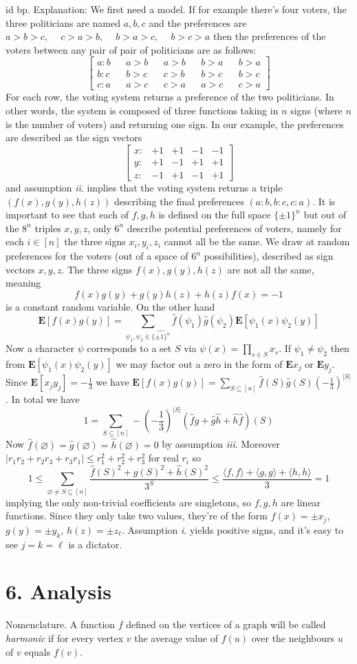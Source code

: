 \documentclass[oneside]{book}
\renewcommand{\empty}{\varnothing}
\newcommand{\sub}{\subseteq}
\newcommand{\inner}[1]{\langle #1\rangle}
\newcommand{\E}{\mathbf{E}}
\newcommand{\set}[1]{\{ #1\}}
\newcommand{\fit}[1]{\left( #1\right)}
\newcommand{\abs}[1]{\left\lvert #1\right\rvert}
\newcommand{\spc}{\phantom{-}}
\renewcommand{\i}{{\it i}. }
\newcommand{\ii}{{\it ii}. }
\newcommand{\iii}{{\it iii}. }
\newcommand\chap[1]{%
  \chapter*{#1}%
  \addcontentsline{toc}{chapter}{#1}}
\begin{document}
id bp. Explanation: We first need a model. If for example there's four voters, the three politicians are named $a,b,c$ and the preferences are
$a>b>c, \spc c>a>b, \spc b>a>c, \spc b>c>a$
then the preferences of the voters between any pair of pair of politicians are as follows:
$$\begin{bmatrix}
    a:b && a>b && a>b && b>a && b>a \\
b:c && b>c && c>b && b>c && b>c \\
c:a && a>c && c>a && a>c && c>a 
\end{bmatrix}$$
For each row, the voting system returns a preference of the two politicians. In other words, the system is composed of three functions taking in $n$ signs (where $n$ is the number of voters) and returning one sign. In our example, the preferences are described as the sign vectors
$$\begin{bmatrix}
x: & +1 & +1 & -1 & -1 \\
y: & +1 & -1 & +1 & +1 \\
z: & -1 & +1 & -1 & +1 
\end{bmatrix}  $$
and assumption \ii implies that the voting system returns a triple $(f(x),g(y),h(z))$ describing the final preferences $(a:b, b:c, c:a)$. It is important to see that each of $f,g,h$ is defined on the full space $\set{\pm1}^n$ but out of the $8^n$ triples $x,y,z$, only $6^n$ describe potential preferences of voters, namely for each $i\in[n]$ the three signs $x_i,y_i,z_i$ cannot all be the same. We draw at random preferences for the voters (out of a space of $6^n$ possibilities), described as sign vectors $x,y,z$. The three signs $f(x),g(y),h(z)$ are not all the same, meaning 
$$f(x)g(y)+g(y)h(z)+h(z)f(x)=-1$$
is a constant random variable. On the other hand
$$\E[f(x)g(y)]=\sum_{\psi_1,\psi_2\in\widehat{\set{\pm1}^n}}\hat{f}(\psi_1)\hat{g}(\psi_2)\E[\psi_1(x)\psi_2(y)]$$
Now a character $\psi$ corresponds to a set $S$ via $\psi(x)=\prod_{s\in S}x_s$. If $\psi_1\neq\psi_2$ then from $\E[\psi_1(x)\psi_2(y)]$ we may factor out a zero in the form of $\E x_j$ or $\E y_j$. Since $\E[x_jy_j]=-\frac{1}{3}$ we have  $\E[f(x)g(y)]=\sum_{S\sub[n]} \hat{f}(S)\hat{g}(S) \fit{-\frac{1}{3}}^{\abs{S}}$. In total we have
$$1 = \sum_{S\sub[n]}-\fit{-\frac{1}{3}}^{\abs{S}}\fit{\hat{f}\hat{g}+\hat{g}\hat{h}+\hat{h}\hat{f}}(S)$$
Now $\hat{f}(\empty)=\hat{g}(\empty)=\hat{h}(\empty)=0$ by assumption \iii Moreover $\abs{r_1r_2+r_2r_3+r_3r_1}\le r_1^2+r_2^2+r_3^2$ for real $r_i$ so 
$$1\le \sum_{\empty\neq S\sub[n]}\dfrac{\hat{f}(S)^2+\hat{g}(S)^2+\hat{h}(S)^2}{3^S}\le \dfrac{\inner{f,f}+\inner{g,g}+\inner{h,h}}{3}=1$$
implying the only non-trivial coefficients are singletons, so $f,g,h$ are linear functions. Since they only take two values, they're of the form $f(x)=\pm x_j$, $g(y)=\pm y_k$, $h(z)=\pm z_\ell$. Assumption \i yields positive signs, and it's easy to see $j=k=\ell$ is a dictator.
\newpage
\chap{6. Analysis}
Nomenclature. A function $f$ defined on the vertices of a graph will be called {\it{harmonic}} if for every vertex $v$ the average value of $f(u)$ over the neighbours $u$ of $v$ equals $f(v)$.  \\\\
\end{document}
